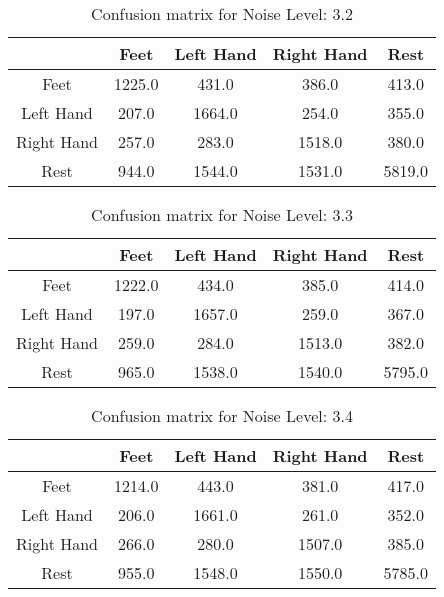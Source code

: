 \begin{table}[!htbp]
    \centering
    \begin{tabular}{|c||c|c|c|c|}
        \hline
		 & Feet & Left Hand & Right Hand & Rest \\
        \hline
        \hline
        Feet & 1225.0 & 431.0 & 386.0 & 413.0 \\
        \hline
        Left Hand & 207.0 & 1664.0 & 254.0 & 355.0 \\
        \hline
        Right Hand & 257.0 & 283.0 & 1518.0 & 380.0 \\
        \hline
        Rest & 944.0 & 1544.0 & 1531.0 & 5819.0 \\
        \hline
    \end{tabular}
    \caption{Confusion matrix for Noise Level: 3.2}
\end{table}

\begin{table}[!htbp]
    \centering
    \begin{tabular}{|c||c|c|c|c|}
        \hline
		 & Feet & Left Hand & Right Hand & Rest \\
        \hline
        \hline
        Feet & 1222.0 & 434.0 & 385.0 & 414.0 \\
        \hline
        Left Hand & 197.0 & 1657.0 & 259.0 & 367.0 \\
        \hline
        Right Hand & 259.0 & 284.0 & 1513.0 & 382.0 \\
        \hline
        Rest & 965.0 & 1538.0 & 1540.0 & 5795.0 \\
        \hline
    \end{tabular}
    \caption{Confusion matrix for Noise Level: 3.3}
\end{table}

\begin{table}[!htbp]
    \centering
    \begin{tabular}{|c||c|c|c|c|}
        \hline
		 & Feet & Left Hand & Right Hand & Rest \\
        \hline
        \hline
        Feet & 1214.0 & 443.0 & 381.0 & 417.0 \\
        \hline
        Left Hand & 206.0 & 1661.0 & 261.0 & 352.0 \\
        \hline
        Right Hand & 266.0 & 280.0 & 1507.0 & 385.0 \\
        \hline
        Rest & 955.0 & 1548.0 & 1550.0 & 5785.0 \\
        \hline
    \end{tabular}
    \caption{Confusion matrix for Noise Level: 3.4}
\end{table}

